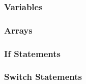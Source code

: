 \subsubsection{Variables}
\subsubsection{Arrays}
\subsubsection{If Statements}
\subsubsection{Switch Statements}
